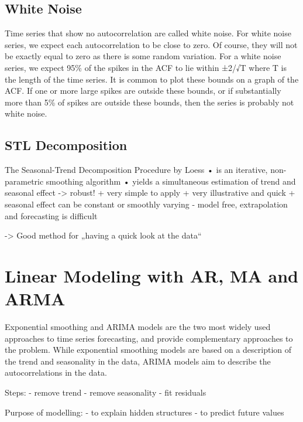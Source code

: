\documentclass[
]{article}
\begin{document}
\hypertarget{white-noise}{%
\subsection{White Noise}\label{white-noise}}

Time series that show no autocorrelation are called white noise. For
white noise series, we expect each autocorrelation to be close to zero.
Of course, they will not be exactly equal to zero as there is some
random variation. For a white noise series, we expect 95\% of the spikes
in the ACF to lie within ±2/√T where T is the length of the time series.
It is common to plot these bounds on a graph of the ACF. If one or more
large spikes are outside these bounds, or if substantially more than 5\%
of spikes are outside these bounds, then the series is probably not
white noise.

\hypertarget{stl-decomposition}{%
\subsection{STL Decomposition}\label{stl-decomposition}}

The Seasonal-Trend Decomposition Procedure by Loess • is an iterative,
non-parametric smoothing algorithm • yields a simultaneous estimation of
trend and seasonal effect -\textgreater{} robust! + very simple to apply
+ very illustrative and quick + seasonal effect can be constant or
smoothly varying - model free, extrapolation and forecasting is
difficult

-\textgreater{} Good method for „having a quick look at the data``

\hypertarget{linear-modeling-with-ar-ma-and-arma}{%
\section{Linear Modeling with AR, MA and
ARMA}\label{linear-modeling-with-ar-ma-and-arma}}

Exponential smoothing and ARIMA models are the two most widely used
approaches to time series forecasting, and provide complementary
approaches to the problem. While exponential smoothing models are based
on a description of the trend and seasonality in the data, ARIMA models
aim to describe the autocorrelations in the data.

Steps: - remove trend - remove seasonality - fit residuals

Purpose of modelling: - to explain hidden structures - to predict future
values
\end{document}
